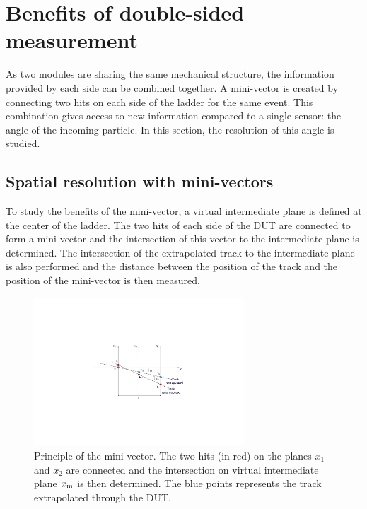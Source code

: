     
  \section{Benefits of double-sided measurement}
  
  As two modules are sharing the same mechanical structure, the information provided by each side can be combined together.
  A mini-vector is created by connecting two hits on each side of the ladder for the same event.
  This combination gives access to new information compared to a single sensor: the angle of the incoming particle.
  In this section, the resolution of this angle is studied.

    \subsection{Spatial resolution with mini-vectors}

    To study the benefits of the mini-vector, a virtual intermediate plane is defined at the center of the ladder.
    The two hits of each side of the \gls{DUT} are connected to form a mini-vector and the intersection of this vector to the intermediate plane is determined.
    The intersection of the extrapolated track to the intermediate plane is also performed and the distance between the position of the track and the position of the mini-vector is then measured.

    \begin{figure}[!h]
      \centering
      \includegraphics[width=0.7\textwidth]{Pictures/deformation/mini_vectors.pdf}
      \caption{Principle of the mini-vector. The two hits (in red) on the planes $x_1$ and $x_2$ are connected and the intersection on virtual intermediate plane $x_{\rm{m}}$ is then determined. The blue points represents the track extrapolated through the DUT. }
      \label{fig:MV}
    \end{figure}

